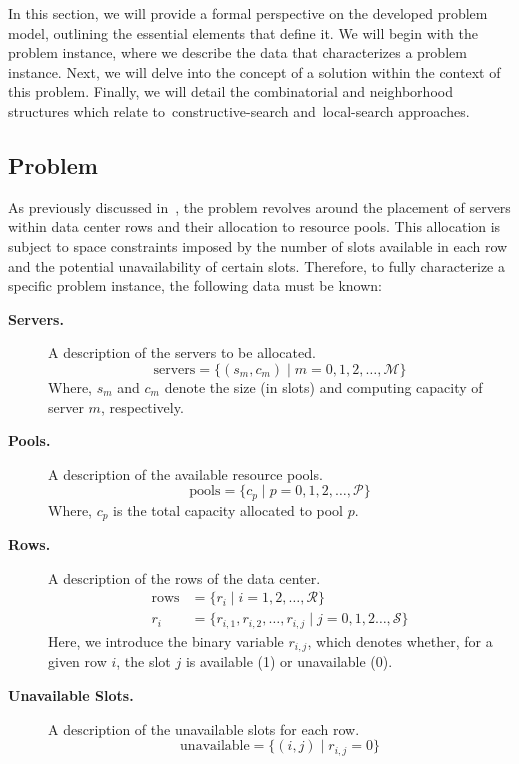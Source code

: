 In this section, we will provide a formal perspective on the developed problem
model, outlining the essential elements that define it. We will begin with the
problem instance, where we describe the data that characterizes a problem
instance. Next, we will delve into the concept of a solution within the context
of this problem. Finally, we will detail the combinatorial and neighborhood
structures which relate to~\acrshort{constructive-search} and~\acrshort{local-search} approaches.

\subsection{Problem}

As previously discussed in~, the problem revolves around
the placement of servers within data center rows and their allocation to
resource pools. This allocation is subject to space constraints imposed by the
number of slots available in each row and the potential unavailability of
certain slots. Therefore, to fully characterize a specific problem instance, the
following data must be known:

\begin{description}
  \item[\textbf{Servers.}] A description of the servers to be allocated.
    \begin{equation}
      \text{servers} = \{(s_m, c_m) \mid m = 0, 1, 2, \ldots, \mathcal{M}\}
    \end{equation}
    Where, $s_{m}$ and $c_{m}$ denote the size (in slots) and computing capacity of server $m$, respectively.
  \item[\textbf{Pools.}] A description of the available resource pools.
    \begin{equation}
      \text{pools} = \{c_{p} \mid p = 0, 1, 2, \ldots, \mathcal{P}\}
    \end{equation}
    Where, $c_{p}$ is the total capacity allocated to pool $p$.
  \item[\textbf{Rows.}] A description of the rows of the data center.
    \begin{equation}
      \begin{aligned}
        \text{rows} & = \{r_i \mid i = 1, 2, \ldots, \mathcal{R}\}                                  \\
        r_i         & = \{r_{i,1}, r_{i,2}, \ldots, r_{i,j} \mid  j = 0, 1, 2 \ldots, \mathcal{S}\}
      \end{aligned}
    \end{equation}
    Here, we introduce the binary variable $r_{i,j}$, which denotes whether, for
    a given row $i$, the slot $j$ is available (1) or unavailable (0).
  \item[\textbf{Unavailable Slots.}] A description of the unavailable slots for each row.
    \begin{equation}
      \text{unavailable} = \{ (i, j) \mid r_{i, j} = 0 \}
    \end{equation}
\end{description}

